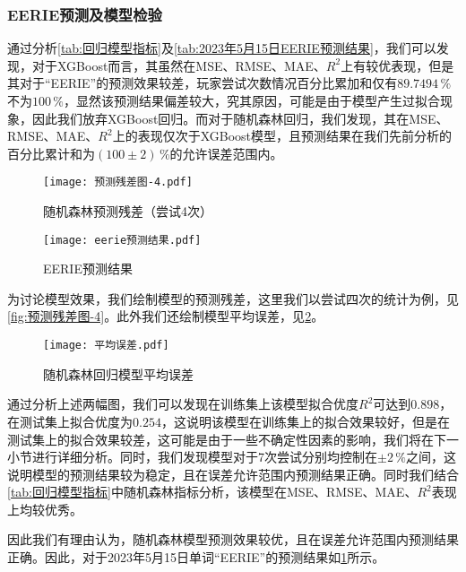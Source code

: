 \documentclass{MathModeling}
\begin{document}
	\subsubsection{EERIE预测及模型检验}
	通过分析\textcolor{blue}{\cref{tab:回归模型指标}}及\textcolor{blue}{\cref{tab:2023年5月15日EERIE预测结果}}，我们可以发现，对于XGBoost而言，其虽然在MSE、RMSE、MAE、$R^2$上有较优表现，但是其对于“EERIE”的预测效果较差，玩家尝试次数情况百分比累加和仅有$89.7494\,\%$不为$100\,\%$，显然该预测结果偏差较大，究其原因，可能是由于模型产生过拟合现象，因此我们放弃XGBoost回归。而对于随机森林回归，我们发现，其在MSE、RMSE、MAE、$R^2$上的表现仅次于XGBoost模型，且预测结果在我们先前分析的百分比累计和为$\left(100\pm2\right)\,\%$的允许误差范围内。

	\begin{figure}[H]
		\centering
		\begin{minipage}{0.48\linewidth}
			\centering
			\texttt{[image: 预测残差图-4.pdf]}
			\caption{随机森林预测残差（尝试4次）}
			\label{fig:预测残差图-4}
		\end{minipage}
		\begin{minipage}{0.48\linewidth}
			\centering
			\texttt{[image: eerie预测结果.pdf]}
			\caption{EERIE预测结果}
			\label{fig:EERIE预测结果}
		\end{minipage}
	\end{figure}

	为讨论模型效果，我们绘制模型的预测残差，这里我们以尝试四次的统计为例，见\textcolor{blue}{\cref{fig:预测残差图-4}}。此外我们还绘制模型平均误差，见\textcolor{blue}{\cref{fig:平均误差}}。
	\begin{figure}[H]
		\centering
		\texttt{[image: 平均误差.pdf]}
		\caption{随机森林回归模型平均误差}
		\label{fig:平均误差}
	\end{figure}

	通过分析上述两幅图，我们可以发现在训练集上该模型拟合优度$R^2$可达到$0.898$，在测试集上拟合优度为$0.254$，这说明该模型在训练集上的拟合效果较好，但是在测试集上的拟合效果较差，这可能是由于一些不确定性因素的影响，我们将在下一小节进行详细分析。同时，我们发现模型对于7次尝试分别均控制在$\pm 2\,\%$之间，这说明模型的预测结果较为稳定，且在误差允许范围内预测结果正确。同时我们结合\textcolor{blue}{\cref{tab:回归模型指标}}中随机森林指标分析，该模型在MSE、RMSE、MAE、$R^2$表现上均较优秀。

	因此我们有理由认为，随机森林模型预测效果较优，且在误差允许范围内预测结果正确。因此，对于2023年5月15日单词“EERIE”的预测结果如\textcolor{blue}{\cref{fig:EERIE预测结果}}所示。
\end{document}

